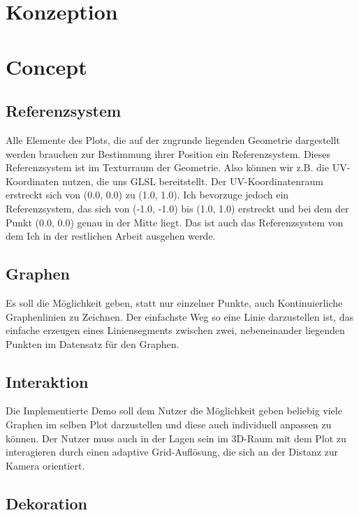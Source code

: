 {\chapter{Konzeption}}
{\chapter{Concept}}
\label{sec:concept}

\section{Referenzsystem}
Alle Elemente des Plots, die auf der zugrunde liegenden Geometrie dargestellt werden brauchen zur Bestimmung ihrer Position ein Referenzsystem.
Dieses Referenzsystem ist im Texturraum der Geometrie.
Also können wir z.B. die UV-Koordinaten nutzen, die uns GLSL bereitstellt.
Der UV-Koordinatenraum erstreckt sich von (0.0, 0.0) zu (1.0, 1.0).
Ich bevorzuge jedoch ein Referenzsystem, das sich von (-1.0, -1.0) bis (1.0, 1.0) erstreckt und bei dem der Punkt (0.0, 0.0) genau in der Mitte liegt.
Das ist auch das Referenzsystem von dem Ich in der restlichen Arbeit ausgehen werde.

\section{Graphen}
Es soll die Möglichkeit geben, statt nur einzelner Punkte, auch Kontinuierliche Graphenlinien zu Zeichnen.
Der einfachste Weg so eine Linie darzustellen ist, das einfache erzeugen eines Liniensegments zwischen zwei, nebeneinander liegenden Punkten im Datensatz für den Graphen.

\section{Interaktion}
Die Implementierte Demo soll dem Nutzer die Möglichkeit geben beliebig viele Graphen im selben Plot darzustellen und diese auch individuell anpassen zu können.
Der Nutzer muss auch in der Lagen sein im 3D-Raum mit dem Plot zu interagieren durch einen adaptive Grid-Auflösung, die sich an der Distanz zur Kamera orientiert.

\section{Dekoration}
